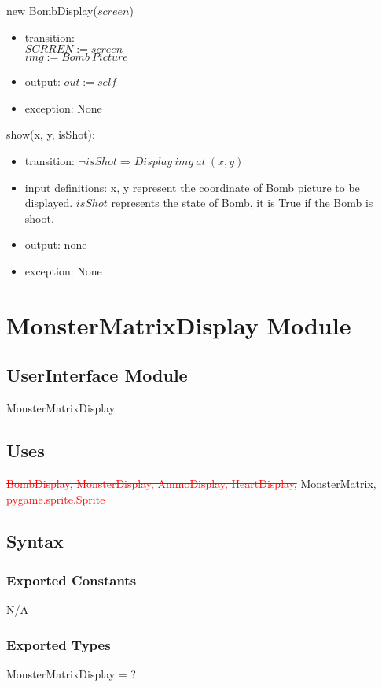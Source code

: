 \documentclass[12pt]{article}
\begin{document}
new BombDisplay($screen$)
\begin{itemize}
    \item transition:\\
    $SCRREN := screen$\\
    $img := Bomb\ Picture$
    \item output: $out := self$
    \item exception: None
\end{itemize}

\noindent show(x, y, isShot):
\begin{itemize}
    \item transition: $\lnot isShot \Rightarrow Display\ img\ at\ (x, y)$
    \item input definitions: x, y represent the coordinate of Bomb
    picture
     to be displayed. $isShot$ represents the state of Bomb, it is True if the Bomb is shoot.
    \item output: none
    \item exception: None
\end{itemize}
\newpage

\section{MonsterMatrixDisplay Module}

\subsection*{UserInterface Module}
MonsterMatrixDisplay

\subsection*{Uses}
\textcolor{red}{\st{BombDisplay, MonsterDisplay, AmmoDisplay, HeartDisplay,}} MonsterMatrix, \textcolor{red}{pygame.sprite.Sprite}

\subsection*{Syntax}
\subsubsection*{Exported Constants}
N/A
\subsubsection*{Exported Types}
MonsterMatrixDisplay = ?
\end{document}
